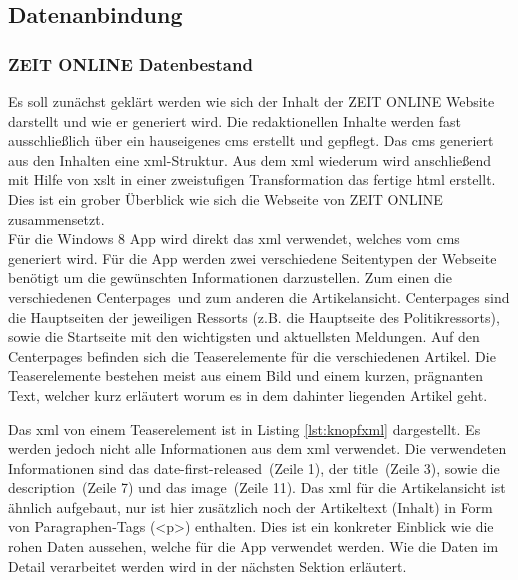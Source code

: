 \documentclass[12pt,a4paper]{scrartcl}
\begin{document}
\subsection{Datenanbindung}
\label{subsec:datenanbindung}

\subsubsection{ZEIT ONLINE Datenbestand}
\label{subsubsec:zondatenbestand}
Es soll zunächst geklärt werden wie sich der Inhalt der ZEIT ONLINE Website darstellt und wie er generiert wird. Die redaktionellen Inhalte werden fast ausschließlich über ein hauseigenes \ac{cms} erstellt und gepflegt. Das \ac{cms} generiert aus den Inhalten eine \ac{xml}-Struktur. Aus dem \ac{xml} wiederum wird anschließend mit Hilfe von \ac{xslt} in einer zweistufigen Transformation das fertige \ac{html} erstellt. Dies ist ein grober Überblick wie sich die Webseite von ZEIT ONLINE zusammensetzt.\\
Für die Windows 8 App wird direkt das \ac{xml} verwendet, welches vom \ac{cms} generiert wird. Für die App werden zwei verschiedene Seitentypen der Webseite benötigt um die gewünschten Informationen darzustellen. Zum einen die verschiedenen \glqq Centerpages\grqq\ und zum anderen die Artikelansicht. Centerpages sind die Hauptseiten der jeweiligen Ressorts (z.B. die Hauptseite des Politikressorts), sowie die Startseite mit den wichtigsten und aktuellsten Meldungen. Auf den Centerpages befinden sich die Teaserelemente für die verschiedenen Artikel. Die Teaserelemente bestehen meist aus einem Bild und einem kurzen, prägnanten Text, welcher kurz erläutert worum es in dem dahinter liegenden Artikel geht.\\

\begin{minipage}{\linewidth}

\end{minipage}

Das \ac{xml} von einem Teaserelement ist in Listing \ref{lst:knopfxml} dargestellt. Es werden jedoch nicht alle Informationen aus dem \ac{xml} verwendet. Die verwendeten Informationen sind das \glqq date-first-released\grqq\ (Zeile 1), der \glqq title\grqq\ (Zeile 3), sowie die \glqq description\grqq\ (Zeile 7) und das \glqq image\grqq\ (Zeile 11). Das \ac{xml} für die Artikelansicht ist ähnlich aufgebaut, nur ist hier zusätzlich noch der Artikeltext (Inhalt) in Form von Paragraphen-Tags (<p>) enthalten. Dies ist ein konkreter Einblick wie die rohen Daten aussehen, welche für die App verwendet werden. Wie die Daten im Detail verarbeitet werden wird in der nächsten Sektion erläutert.
\end{document}
